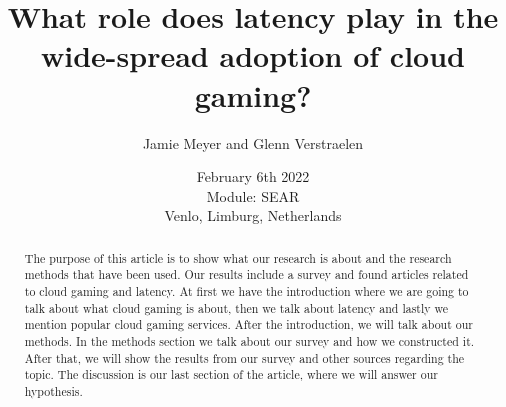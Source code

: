 \documentclass[]{report}
\title{What role does latency play in the wide-spread adoption of cloud gaming?}
\author{Jamie Meyer and Glenn Verstraelen}
\date{February 6th 2022 \\Module: SEAR \\Venlo, Limburg, Netherlands}
\begin{document}
\maketitle

\begin{abstract}
The purpose of this article is to show what our research is about and the research methods that have been used. Our results include a survey and found articles related to cloud gaming and latency. At first we have the introduction where we are going to talk about what cloud gaming is about, then we talk about latency and lastly we mention popular cloud gaming services. After the introduction, we will talk about our methods. In the methods section we talk about our survey and how we constructed it. After that, we will show the results from our survey and other sources regarding the topic. The discussion is our last section of the article, where we will answer our hypothesis. 
\end{abstract}

\tableofcontents
\setcounter{page}{3}
{%
	\let\oldnumberline\numberline%
	\renewcommand{\numberline}{\figurename~\oldnumberline}%
	\listoffigures%
}
\pagebreak
{}	
	
 
 
 
 

\printbibliography[title=References]



\appendix

\end{document}
